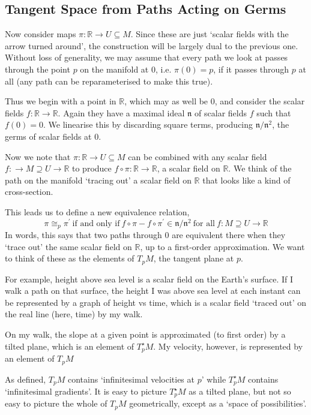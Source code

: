 \documentclass[oneside,english]{amsbook}
\numberwithin{section}{chapter}
\theoremstyle{plain}
\theoremstyle{definition}
\begin{document}
\subsection{Tangent Space from Paths Acting on Germs}

Now consider maps $\pi:\mathbb{R}\to U\subseteq M$. Since these are just `scalar fields with the arrow turned around', the construction will be largely dual to the previous one. Without loss of generality, we may assume that every path we look at passes through the point $p$ on the manifold at 0, i.e. $\pi(0) = p$, if it passes through $p$ at all (any path can be reparameterised to make this true).

Thus we begin with a point in $\mathbb{R}$, which may as well be 0, and consider the scalar fields $f:\mathbb{R}\to\mathbb{R}$. Again they have a maximal ideal $\mathfrak{n}$ of scalar fields $f$ such that $f(0)=0$. We linearise this by discarding square terms, producing $\mathfrak{n}/\mathfrak{n}^2$, the germs of scalar fields at $0$.

Now we note that $\pi:\mathbb{R}\to U\subseteq M$ can be combined with any scalar field $f:\to M\supseteq U\to \mathbb{R}$ to produce $f\circ\pi:\mathbb{R}\to\mathbb{R}$, a scalar field on $\mathbb{R}$. We think of the path on the manifold `tracing out' a scalar field on $\mathbb{R}$ that looks like a kind of cross-section. 

This leads us to define a new equivalence relation,
\[
	\pi\cong_p\pi^\prime \ \text{if and only if} \ f\circ\pi - f\circ\pi^\prime \in \mathfrak{n}/\mathfrak{n}^2 \ \text{for all} \ f:M\supseteq U\to \mathbb{R} 
\] 
In words, this says that two paths through $0$ are equivalent there when they `trace out' the same scalar field on $\mathbb{R}$, up to a first-order approximation. We want to think of these as the elements of $T_p M$, the tangent plane at $p$.

For example, height above sea level is a scalar field on the Earth's surface. If I walk a path on that surface, the height I was above sea level at each instant can be represented by a graph of height vs time, which is a scalar field `traced out' on the real line (here, time) by my walk.

On my walk, the slope at a given point is approximated (to first order) by a tilted plane, which is an element of $T_p^\star M$. My velocity, however, is represented by an element of $T_p M$

As defined, $T_p M$ contains `infinitesimal velocities at $p$' while $T_p^\star M$ contains `infinitesimal gradients'. It is easy to picture $T_p^\star M$ as a tilted plane, but not so easy to picture the whole of $T_p M$ geometrically, except as a `space of possibilities'.
\end{document}
